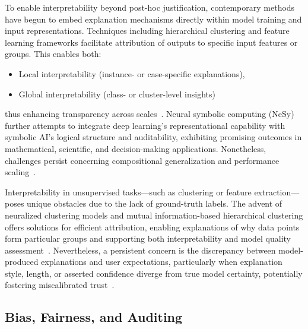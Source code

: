 \documentclass[sigconf]{acmart}
\begin{document}
To enable interpretability beyond post-hoc justification, contemporary methods have begun to embed explanation mechanisms directly within model training and input representations. Techniques including hierarchical clustering and feature learning frameworks facilitate attribution of outputs to specific input features or groups. This enables both:
\begin{itemize}
    \item Local interpretability (instance- or case-specific explanations),
    \item Global interpretability (class- or cluster-level insights)
\end{itemize}
thus enhancing transparency across scales~\cite{ref36, ref52, ref83}. Neural symbolic computing (NeSy) further attempts to integrate deep learning’s representational capability with symbolic AI’s logical structure and auditability, exhibiting promising outcomes in mathematical, scientific, and decision-making applications. Nonetheless, challenges persist concerning compositional generalization and performance scaling~\cite{ref19, ref35, ref73, ref84}.

Interpretability in unsupervised tasks---such as clustering or feature extraction---poses unique obstacles due to the lack of ground-truth labels. The advent of neuralized clustering models and mutual information-based hierarchical clustering offers solutions for efficient attribution, enabling explanations of why data points form particular groups and supporting both interpretability and model quality assessment~\cite{ref45, ref52, ref84}. Nevertheless, a persistent concern is the discrepancy between model-produced explanations and user expectations, particularly when explanation style, length, or asserted confidence diverge from true model certainty, potentially fostering miscalibrated trust~\cite{ref49, ref81}.

\subsection{Bias, Fairness, and Auditing}
\end{document}
